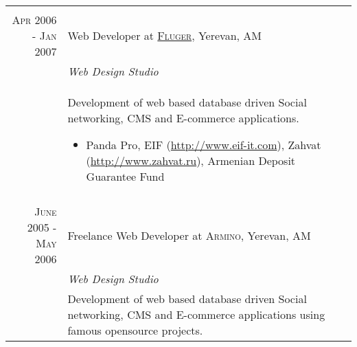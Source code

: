\documentclass[a4paper,10pt]{article}
\begin{document}
\begin{tabular}{r|p{11cm}}
\multicolumn{2}{c}{} \\


\textsc{Apr 2006 - Jan 2007}
  & Web Developer at \textsc{\href{http://www.fluger.com}{Fluger}},
    Yerevan, AM \\
  & \emph{Web Design Studio} \\
  & \footnotesize{ Development of web based database driven Social networking,
    CMS and E-commerce applications.
    \begin{itemize}
      \item Panda Pro,
        EIF (\href{http://www.eif-it.com}{http://www.eif-it.com}),
        Zahvat (\href{http://www.zahvat.ru}{http://www.zahvat.ru}),
        Armenian Deposit Guarantee Fund
    \end{itemize}
}\\


\multicolumn{2}{c}{} \\


\textsc{June 2005 - May 2006}
  & Freelance Web Developer at \textsc{Armino}, Yerevan, AM \\
  & \emph{Web Design Studio}\\
  & \footnotesize{Development of web based database driven Social networking,
    CMS and E-commerce applications using famous opensource projects.}

\end{tabular}


\end{document}

